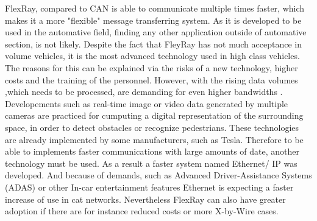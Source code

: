 \documentclass[conference]{IEEEtran}
\begin{document}
FlexRay, compared to CAN is able to communicate multiple times faster, which makes it a more "flexible" message transferring system. As it is developed to be used in the automative field, finding any other application outside of automative section, is not likely. Despite the fact that FleyRay has not much acceptance in volume vehicles, it is the most advanced technology used in high class vehicles. The reasons for this can be explained via the risks of a new technology, higher costs and the training of the personnel. However, with the rising data volumes ,which needs to be processed, are demanding for even higher bandwidths \cite{hammerschmidt2010beyond}. Developements such as real-time image or video data generated by multiple cameras are practiced for cumputing a digital representation of the surrounding space, in order to detect obstacles or recognize pedestrians. These technologies are already implemented by some manufacturers, such as Tesla. Therefore to be able to implements faster communications with large amounts of date, another technology must be used. As a result a faster system named Ethernet/ IP was developed. And because of demands, such as Advanced Driver-Assistance Systems (ADAS) or other In-car entertainment features Ethernet is expecting a faster increase of use in cat networks. Nevertheless FlexRay can also have greater adoption if there are for instance reduced costs or more X-by-Wire cases.




\end{document}
